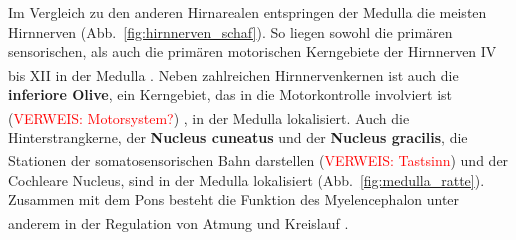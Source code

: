 \documentclass[12pt,a4paper,pdftex]{article}
\begin{document}
\noindent Im Vergleich zu den anderen Hirnarealen entspringen der Medulla die meisten Hirnnerven (Abb.~\ref{fig:hirnnerven_schaf}). So liegen sowohl die primären sensorischen, als auch die primären motorischen Kerngebiete der Hirnnerven IV bis XII in der Medulla \textsuperscript{\cite[14]{penzlin2005tierphys}}. Neben zahlreichen Hirnnervenkernen ist auch die \textbf{inferiore Olive}, ein Kerngebiet, das in die Motorkontrolle involviert ist (\textcolor{red}{VERWEIS: Motorsystem?})  \textsuperscript{\cite[9]{crossman2014neuroanatomy}}, in der Medulla lokalisiert. Auch die Hinterstrangkerne, der \textbf{Nucleus cuneatus} und der \textbf{Nucleus gracilis}, die Stationen der somatosensorischen Bahn darstellen (\textcolor{red}{VERWEIS:  Tastsinn}) \textsuperscript{\cite[5]{trepel2011neuroanatomie}} und der Cochleare Nucleus, sind in der Medulla lokalisiert (Abb.~\ref{fig:medulla_ratte}). Zusammen mit dem Pons besteht die Funktion des Myelencephalon unter anderem in der Regulation von Atmung und Kreislauf \textsuperscript{\cite[14]{penzlin2005tierphys}}.
\end{document}
